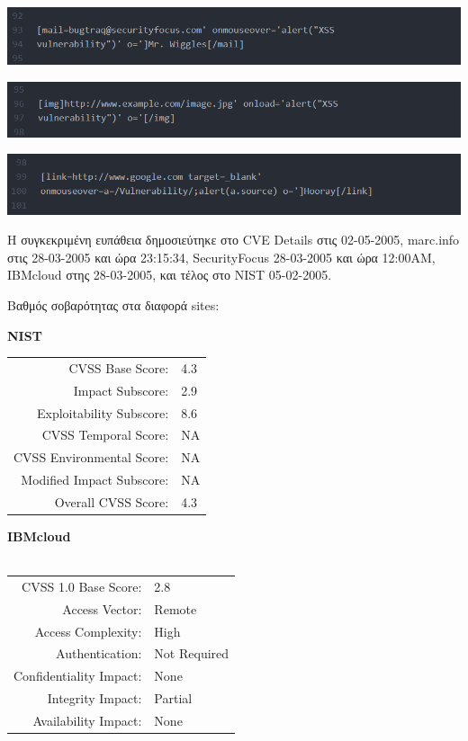 \begin{center}
			\includegraphics[width=1\textwidth]{image/28.PNG}		
\end{center}

\begin{center}
			\includegraphics[width=1\textwidth]{image/29.PNG}		
\end{center}

\begin{center}
			\includegraphics[width=1\textwidth]{image/30.PNG}		
\end{center}

\noindent
Η συγκεκριμένη ευπάθεια δημοσιεύτηκε στο CVE Details στις 02-05-2005, marc.info στις 28-03-2005 και ώρα 23:15:34, SecurityFocus 28-03-2005 και ώρα 12:00ΑΜ, ΙΒΜcloud στης 28-03-2005, και τέλος στο NIST 05-02-2005. 

\noindent
Βαθμός σοβαρότητας στα διαφορά sites:



\textbf{NIST}

\begin{tabular}{rl}
\hline
CVSS Base Score: & 	4.3\\
Impact Subscore: & 2.9 \\ 
Exploitability Subscore: & 8.6\\
CVSS Temporal Score: &    NA\\
CVSS Environmental Score: &  NA\\
Modified Impact Subscore: &    NA\\
Overall CVSS Score: &    4.3\\
\hline
\end{tabular}

\textbf{ΙΒΜcloud}
\\
\\
\begin{tabular}{rl}
\hline
CVSS 1.0 Base Score: & 2.8 \\
Access Vector: 	& Remote \\
Access Complexity: &	High \\ 
Authentication: & Not Required \\
Confidentiality Impact: & None \\
Integrity Impact: & Partial \\ 
Availability Impact: & None \\
\hline
\end{tabular}


